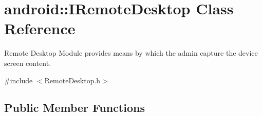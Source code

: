 \hypertarget{classandroid_1_1IRemoteDesktop}{\section{android\-:\-:\-I\-Remote\-Desktop \-Class \-Reference}
\label{classandroid_1_1IRemoteDesktop}
}


\-Remote \-Desktop \-Module provides means by which the admin capture the device screen content.  




{\ttfamily \#include $<$\-Remote\-Desktop.\-h$>$}

\subsection*{\-Public \-Member \-Functions}

